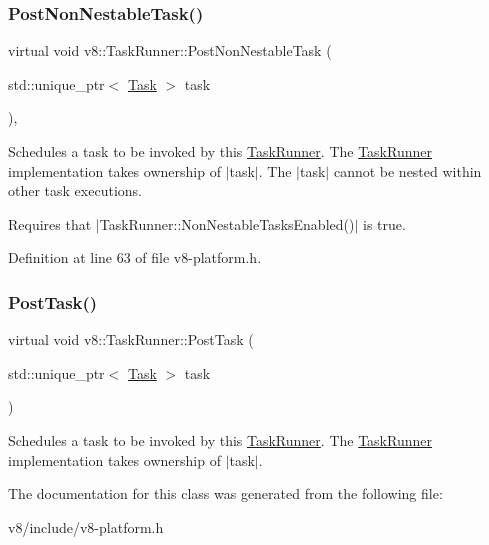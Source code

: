 \subsubsection{\texorpdfstring{Post\+Non\+Nestable\+Task()}{PostNonNestableTask()}}
{\footnotesize\ttfamily virtual void v8\+::\+Task\+Runner\+::\+Post\+Non\+Nestable\+Task (\begin{DoxyParamCaption}\item[{std\+::unique\+\_\+ptr$<$ \mbox{\hyperlink{classv8_1_1Task}{Task}} $>$}]{task }\end{DoxyParamCaption})\hspace{0.3cm}{\ttfamily [inline]}, {\ttfamily [virtual]}}

Schedules a task to be invoked by this \mbox{\hyperlink{classv8_1_1TaskRunner}{Task\+Runner}}. The \mbox{\hyperlink{classv8_1_1TaskRunner}{Task\+Runner}} implementation takes ownership of $\vert$task$\vert$. The $\vert$task$\vert$ cannot be nested within other task executions.

Requires that $\vert$\+Task\+Runner\+::\+Non\+Nestable\+Tasks\+Enabled()$\vert$ is true. 

Definition at line 63 of file v8-\/platform.\+h.

\mbox{\label{classv8_1_1TaskRunner_a755795cc77383daf067a17673569c685}} 
\subsubsection{\texorpdfstring{Post\+Task()}{PostTask()}}
{\footnotesize\ttfamily virtual void v8\+::\+Task\+Runner\+::\+Post\+Task (\begin{DoxyParamCaption}\item[{std\+::unique\+\_\+ptr$<$ \mbox{\hyperlink{classv8_1_1Task}{Task}} $>$}]{task }\end{DoxyParamCaption})\hspace{0.3cm}{\ttfamily [pure virtual]}}

Schedules a task to be invoked by this \mbox{\hyperlink{classv8_1_1TaskRunner}{Task\+Runner}}. The \mbox{\hyperlink{classv8_1_1TaskRunner}{Task\+Runner}} implementation takes ownership of $\vert$task$\vert$. 

The documentation for this class was generated from the following file\+:\begin{DoxyCompactItemize}
\item 
v8/include/v8-\/platform.\+h\end{DoxyCompactItemize}
